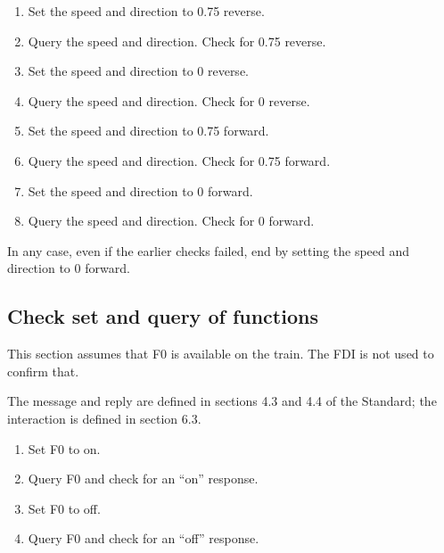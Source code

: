 \begin{enumerate}

    \item Set the speed and direction to 0.75 reverse.

    \item Query the speed and direction. Check for 0.75 reverse.

    \item Set the speed and direction to 0 reverse.

    \item Query the speed and direction. Check for 0 reverse.

    \item Set the speed and direction to 0.75 forward.

    \item Query the speed and direction. Check for 0.75 forward.

    \item Set the speed and direction to 0 forward.

    \item Query the speed and direction. Check for 0 forward.

\end{enumerate}

In any case, even if the earlier checks failed, end by setting the speed 
and direction to 0 forward.

\subsection{Check set and query of functions}

This section assumes that F0 is available on the train.
The FDI is not used to confirm that.

The message and reply are defined in sections 4.3 and 4.4 of the Standard;
the interaction is defined in section 6.3.

\begin{enumerate}

    \item Set F0 to on.

    \item Query F0 and check for an ``on'' response.

    \item Set F0 to off.

    \item Query F0 and check for an ``off'' response.

\end{enumerate}

